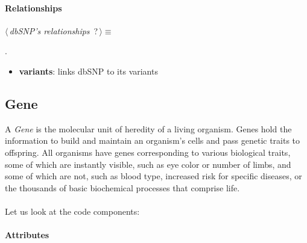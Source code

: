 \newpage

\paragraph{Relationships} 

	\begin{flushleft} \small
\begin{minipage}{\linewidth}\label{scrap5}\raggedright\small
{} $\langle\,${\itshape {dbSNP's relationships}}\nobreak\ {\footnotesize {?}}$\,\rangle\equiv$
\vspace{-1ex}
\begin{list}{}{} \item

                
        {\NWsep}
\end{list}
\vspace{-1.5ex}
\footnotesize
\begin{list}{}{\setlength{\itemsep}{-\parsep}\setlength{\itemindent}{-\leftmargin}}
\item {\NWtxtMacroNoRef}.

\item{}
\end{list}
\end{minipage}\vspace{4ex}
\end{flushleft}
\begin{itemize}
 	\item \textbf{variants}: links dbSNP to its variants
\end{itemize}


\subsection{Gene}
A \emph{Gene} is the molecular unit of heredity of a living organism. Genes hold the information to build and maintain an organism's cells and pass genetic traits to offspring. All organisms have genes corresponding to various biological traits, some of which are instantly visible, such as eye color or number of limbs, and some of which are not, such as blood type, increased risk for specific diseases, or the thousands of basic biochemical processes that comprise life.
\\
\\Let us look at the code components:

\newpage

\paragraph{Attributes}      

